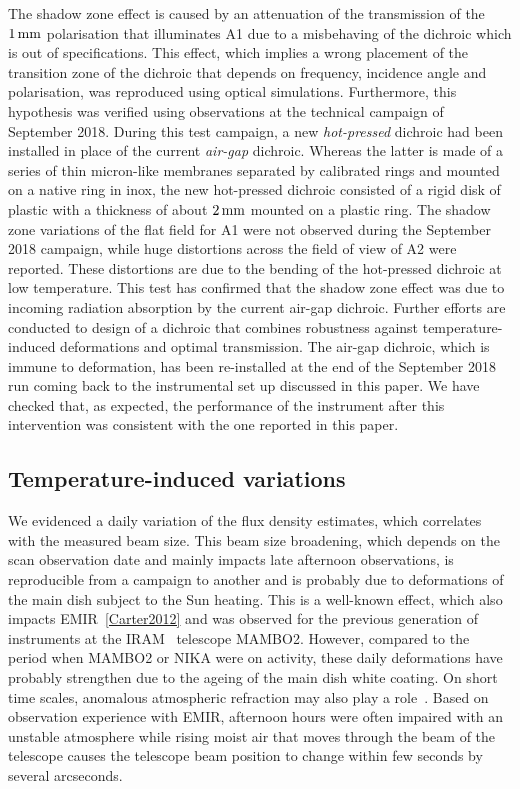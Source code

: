 The shadow zone effect is caused by an attenuation of
the transmission of the $1\,\rm{mm}$ polarisation that illuminates
A1 due to a misbehaving of the dichroic which is out of
specifications.
This effect,
which implies a wrong placement of the transition zone of the dichroic
that depends on frequency, incidence angle and polarisation, was
reproduced using optical simulations. Furthermore, this hypothesis was
verified using observations at the technical campaign of September
2018. During this test campaign, a new \emph{hot-pressed} dichroic had
been installed in place of the current \emph{air-gap} dichroic.
Whereas the latter is made of a series of thin
micron-like membranes separated by calibrated rings and mounted on
a native ring in inox, the new hot-pressed dichroic consisted of a
rigid disk of plastic with a thickness of about $2\,\rm{mm}$ mounted on a
plastic ring. The shadow zone variations of the flat field for A1 were
not observed during the September 2018 campaign, while huge distortions
across the field of view of A2 were reported. These distortions are
due to the bending of the hot-pressed dichroic at low temperature.
This test has
confirmed that the shadow zone effect was due
to incoming radiation absorption by the current air-gap dichroic.
Further efforts are conducted to design of a dichroic that combines
robustness against temperature-induced deformations and optimal
transmission.
{\lp The air-gap dichroic, which is immune to deformation, has been
re-installed at the end of the September 2018 run coming back to the
instrumental set up discussed in this paper. We have checked that, as
expected, the performance of the instrument after this intervention
was consistent with the one reported in this paper.} 



\subsection{Temperature-induced variations}
\label{se:beam_variation}
We evidenced a daily variation of the flux density estimates,
which correlates with the measured beam size.
This beam size broadening, which depends on the
scan observation date and mainly impacts late
afternoon observations, is reproducible from a campaign to another and 
is probably due to deformations of the main dish subject to the Sun
heating. This is a well-known effect, which also impacts
EMIR~\ref{Carter2012} and was observed for the previous generation of
instruments at the IRAM \trentemetre\ telescope MAMBO2. However,
compared to the period when MAMBO2 or NIKA were on activity, these
daily deformations have probably strengthen due to the ageing of the
main dish white coating. On short time scales, anomalous atmospheric
refraction
may also play a role~\citep{Altenhoff1987}. Based on observation
experience with EMIR, afternoon hours were often impaired with an
unstable atmosphere while rising moist air that
moves through the beam of the telescope causes the telescope beam
position to change within few seconds by several arcseconds.

